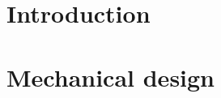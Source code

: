 \documentclass[a4paper,11pt]{article}
\begin{document}


\begingroup
\hypersetup{linkcolor=black}
\tableofcontents
\endgroup
\newpage

\section{Introduction\label{sec:Introduction}}


\section{Mechanical design \label{sec:Mechanics}}






\newpage
\printbibliography 
\end{document}
